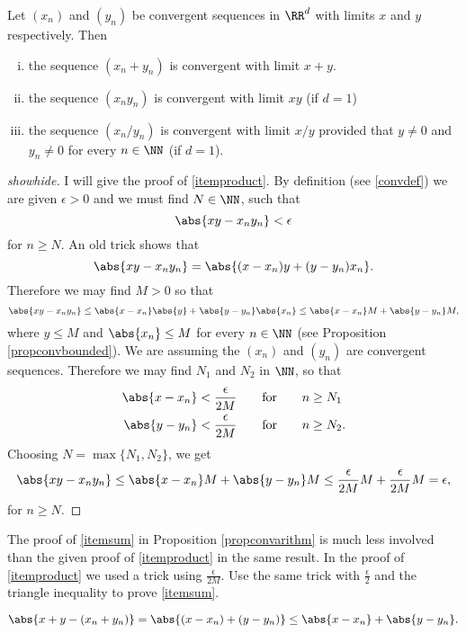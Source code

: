 \documentclass{article}
\begin{document}
\begin{frameit}
\begin{proposition}\label{propconvarithm}
Let $(x_n)$ and $(y_n)$ be convergent sequences in $\RR^d$ with limits
$x$ and $y$ respectively. Then
\begin{enumerate}[(i)]
\item\label{itemsum}
the sequence $(x_n + y_n)$ is convergent with limit $x + y$.
\item\label{itemproduct}
the sequence $(x_n y_n)$ is convergent with limit $x y$ (if $d=1$)
\item
the sequence $(x_n/y_n)$ is convergent with limit $x/y$ provided
that $y\neq 0$ and $y_n \neq 0$ for every $n\in\NN$ (if $d=1$).
\end{enumerate}
\end{proposition}
\end{frameit}
  \begin{proof}[showhide]
    I will give the proof of \ref{itemproduct}. By definition (see
    \eqref{convdef}) we are given $\epsilon > 0$ and we must find
    $N\in \NN$, such that
    $$
    \abs{x y - x_n y_n} < \epsilon
    $$
    for $n\geq N$. An old trick shows that
    $$
    \abs{x y - x_n y_n} = \abs{(x-x_n) y + (y - y_n) x_n}.
    $$
    Therefore we may find $M > 0$ so that 
    $$
    \abs{x y - x_n y_n} \leq \abs{x-x_n}\abs{y} + \abs{y - y_n}\abs{ x_n} \leq \abs{x-x_n} M + \abs{y-y_n} M,
    $$
    where $y \leq M$ and $\abs{x_n}\leq M$ for every $n\in \NN$ (see Proposition \ref{propconvbounded}).
    We are assuming the $(x_n)$ and $(y_n)$ are convergent sequences. Therefore we may find
    $N_1$ and $N_2$ in $\NN$, so that
    \begin{align*}
      \abs{x - x_n} &< \frac{\epsilon}{2 M}\qquad\text{for}\qquad n \geq N_1\\
      \abs{y - y_n} &< \frac{\epsilon}{2 M}\qquad\text{for}\qquad n \geq N_2.
    \end{align*}
    Choosing $N = \max\{N_1, N_2\}$, we get
    $$
    \abs{x y - x_n y_n} \leq \abs{x-x_n} M + \abs{y-y_n} M \leq \frac{\epsilon}{2 M} M + \frac{\epsilon}{2 M} M = \epsilon,
    $$
    for $n\geq N$.
  \end{proof}

\beginshex
The proof of \ref{itemsum} in Proposition \ref{propconvarithm} is much less involved
than the given proof of \ref{itemproduct} in the same result. In the proof of
\ref{itemproduct} we used a trick using $\frac{\epsilon}{2M}$. Use the same
trick with $\frac{\epsilon}{2}$ and the triangle inequality to prove
\ref{itemsum}.
\begin{hint}
  $$
  \abs{x + y - (x_n + y_n)} = \abs{(x - x_n) + (y - y_n)} \leq \abs{x - x_n} + \abs{y - y_n}. 
  $$
\end{hint}
\endshex
\end{document}
